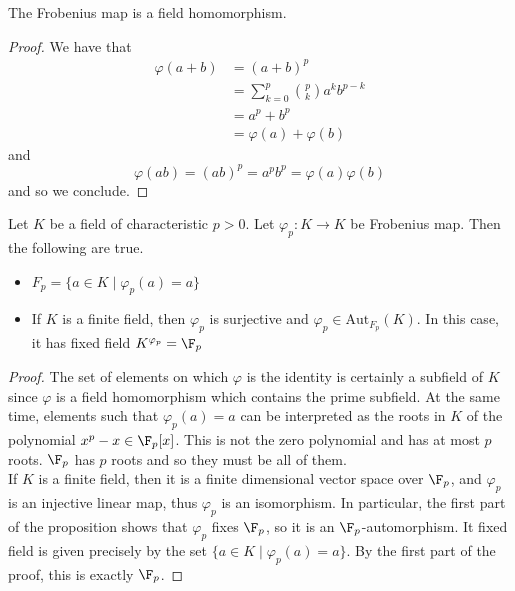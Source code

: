 \documentclass[a4paper]{article}
\begin{document}
\begin{lmm}{}{} The Frobenius map is a field homomorphism. 
\begin{proof}
We have that 
\begin{align*}
\varphi(a+b)&=(a+b)^p\\
&=\sum_{k=0}^p\binom{p}{k}a^kb^{p-k}\\
&=a^p+b^p\\
&=\varphi(a)+\varphi(b)
\end{align*}
and $$\varphi(ab)=(ab)^p=a^pb^p=\varphi(a)\varphi(b)$$ and so we conclude. 
\end{proof}
\end{lmm}

\begin{prp}{}{} Let $K$ be a field of characteristic $p>0$. Let $\varphi_p:K\to K$ be Frobenius map. Then the following are true. 
\begin{itemize}
\item $F_p=\{a\in K\;|\;\varphi_p(a)=a\}$
\item If $K$ is a finite field, then $\varphi_p$ is surjective and $\varphi_p\in\text{Aut}_{F_p}(K)$. In this case, it has fixed field $K^{\varphi_p}=\F_p$
\end{itemize} 
\begin{proof}
The set of elements on which $\varphi$ is the identity is certainly a subfield of $K$ since $\varphi$ is a field homomorphism which contains the prime subfield. At the same time, elements such that $\varphi_p(a)=a$ can be interpreted as the roots in $K$ of the polynomial $x^p-x\in\F_p[x]$. This is not the zero polynomial and has at most $p$ roots. $\F_p$ has $p$ roots and so they must be all of them. \\

If $K$ is a finite field, then it is a finite dimensional vector space over $\F_p$, and $\varphi_p$ is an injective linear map, thus $\varphi_p$ is an isomorphism. In particular, the first part of the proposition shows that $\varphi_p$ fixes $\F_p$, so it is an $\F_p$-automorphism. It fixed field is given precisely by the set $\{a\in K\;|\;\varphi_p(a)=a\}$. By the first part of the proof, this is exactly $\F_p$. 
\end{proof}
\end{prp}
\end{document}
